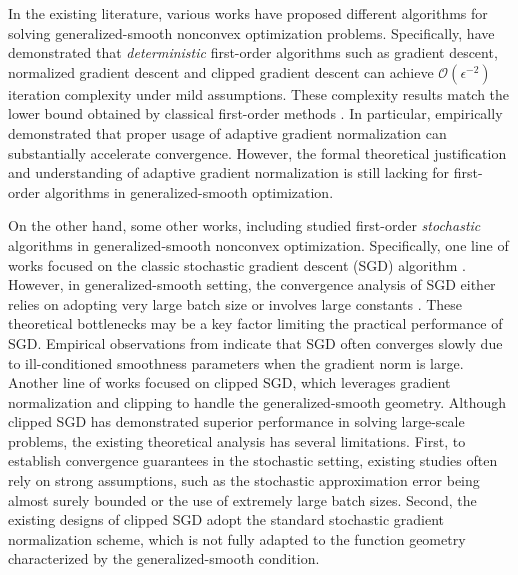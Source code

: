 \documentclass[10pt]{article} %
\begin{document}
In the existing literature, various works have proposed different algorithms for solving generalized-smooth nonconvex optimization problems. Specifically, \citet{ li2023convexnonconvexoptimizationgeneralized,zhang2020gradientclippingacceleratestraining,pmlr-v202-chen23ar,petergensmooth,L0L1newstudy,reisizadeh2023variancereducedclippingnonconvexoptimization} have demonstrated that {\em deterministic} first-order algorithms such as gradient descent, normalized gradient descent and clipped gradient descent can achieve $\mathcal{O}(\epsilon^{-2})$ iteration complexity under mild assumptions. These complexity results match the lower bound obtained by classical first-order methods \citep{lowerbound}. 
In particular, \citet{pmlr-v202-chen23ar} empirically demonstrated that proper usage of adaptive gradient normalization can substantially accelerate convergence. However, the formal theoretical justification and understanding of adaptive gradient normalization is still lacking for first-order algorithms in generalized-smooth optimization.



On the other hand, some other works, including \citet{li2023convexnonconvexoptimizationgeneralized,zhang2020gradientclippingacceleratestraining,genralclip} studied first-order {\em stochastic} algorithms in generalized-smooth nonconvex optimization.
Specifically, one line of works \citep{li2023convexnonconvexoptimizationgeneralized} focused on the classic stochastic gradient descent (SGD) algorithm \citep{ghadimi2013stochastic}. However, in generalized-smooth setting, the convergence analysis of SGD either relies on adopting very large batch size or involves large constants \citep{li2023convexnonconvexoptimizationgeneralized}. These theoretical bottlenecks may be a key factor limiting the practical performance of SGD. Empirical observations from \citet{pmlr-v202-chen23ar} indicate that SGD often converges slowly due to ill-conditioned smoothness parameters when the gradient norm is large.
Another line of works \citep{zhang2020gradientclippingacceleratestraining, genralclip,reisizadeh2023variancereducedclippingnonconvexoptimization, usitchclip} focused on clipped SGD, which leverages gradient normalization and clipping to handle the generalized-smooth geometry. Although clipped SGD has demonstrated superior performance in solving large-scale problems,
the existing theoretical analysis has several limitations. First, to establish convergence guarantees in the stochastic setting, existing studies often rely on strong assumptions, such as the stochastic approximation error being almost surely bounded or the use of extremely large batch sizes.
Second, the existing designs of clipped SGD adopt the standard stochastic gradient normalization scheme, which is not fully adapted to the function geometry characterized by the generalized-smooth condition.
\end{document}
